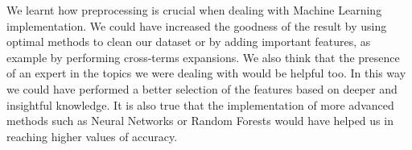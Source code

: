 \documentclass[10pt,article]{IEEEtran}
\begin{document}
We learnt how preprocessing is crucial when dealing with Machine Learning implementation. We could have increased the goodness of the result by using optimal methods to clean our dataset or by adding important features, as example by performing cross-terms expansions. We also think that the presence of an expert in the topics we were dealing with would be helpful too. In this way we could have performed a better selection of the features based on deeper and insightful knowledge. It is also true that the implementation of more advanced methods such as Neural Networks or Random Forests would have helped us in reaching higher values of accuracy.




\end{document}
